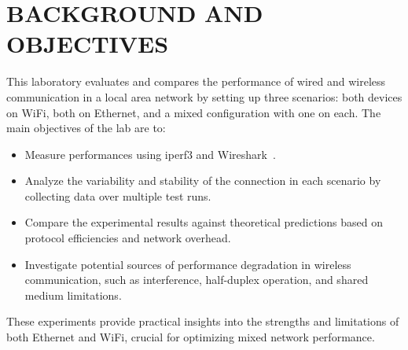 
\section{BACKGROUND AND OBJECTIVES} \label{sec:background-and-objectives}

    This laboratory evaluates and compares the performance of wired and wireless communication in a local area network by setting up three scenarios: both devices on WiFi, both on Ethernet, and a mixed configuration with one on each.
    The main objectives of the lab are to:

    \begin{itemize}
        \item Measure performances using iperf3 and Wireshark~\cite{iperf3, wireshark}.
        \item Analyze the variability and stability of the connection in each scenario by collecting data over multiple test runs.
        \item Compare the experimental results against theoretical predictions based on protocol efficiencies and network overhead.
        \item Investigate potential sources of performance degradation in wireless communication, such as interference, half-duplex operation, and shared medium limitations.
    \end{itemize}

    \noindent These experiments provide practical insights into the strengths and limitations of both Ethernet and WiFi, crucial for optimizing mixed network performance.
